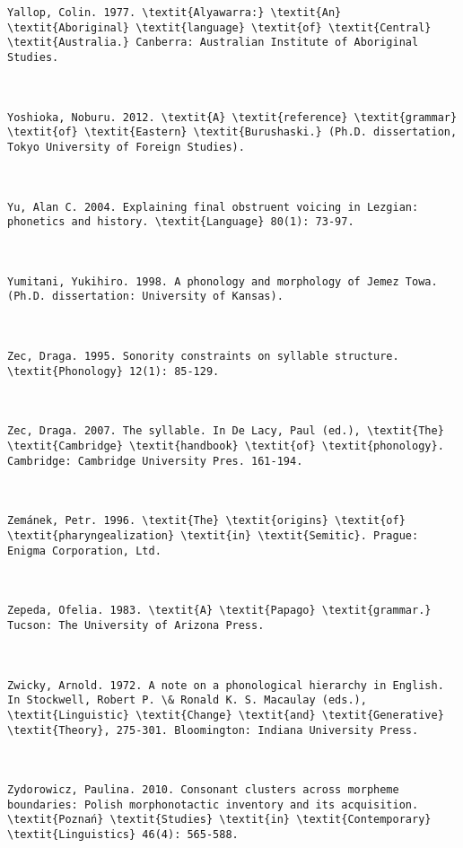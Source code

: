 \begin{verbatim}
Yallop, Colin. 1977. \textit{Alyawarra:} \textit{An} \textit{Aboriginal} \textit{language} \textit{of} \textit{Central} \textit{Australia.} Canberra: Australian Institute of Aboriginal Studies.



Yoshioka, Noburu. 2012. \textit{A} \textit{reference} \textit{grammar} \textit{of} \textit{Eastern} \textit{Burushaski.} (Ph.D. dissertation, Tokyo University of Foreign Studies).



Yu, Alan C. 2004. Explaining final obstruent voicing in Lezgian: phonetics and history. \textit{Language} 80(1): 73-97.



Yumitani, Yukihiro. 1998. A phonology and morphology of Jemez Towa. (Ph.D. dissertation: University of Kansas).



Zec, Draga. 1995. Sonority constraints on syllable structure. \textit{Phonology} 12(1): 85-129.



Zec, Draga. 2007. The syllable. In De Lacy, Paul (ed.), \textit{The} \textit{Cambridge} \textit{handbook} \textit{of} \textit{phonology}. Cambridge: Cambridge University Pres. 161-194.



Zemánek, Petr. 1996. \textit{The} \textit{origins} \textit{of} \textit{pharyngealization} \textit{in} \textit{Semitic}. Prague: Enigma Corporation, Ltd.



Zepeda, Ofelia. 1983. \textit{A} \textit{Papago} \textit{grammar.} Tucson: The University of Arizona Press.



Zwicky, Arnold. 1972. A note on a phonological hierarchy in English. In Stockwell, Robert P. \& Ronald K. S. Macaulay (eds.), \textit{Linguistic} \textit{Change} \textit{and} \textit{Generative} \textit{Theory}, 275-301. Bloomington: Indiana University Press.



Zydorowicz, Paulina. 2010. Consonant clusters across morpheme boundaries: Polish morphonotactic inventory and its acquisition. \textit{Poznań} \textit{Studies} \textit{in} \textit{Contemporary} \textit{Linguistics} 46(4): 565-588.

 
\end{verbatim}

